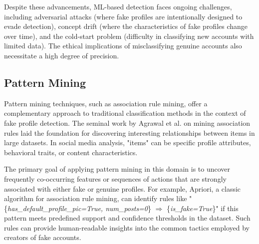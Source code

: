 \documentclass[conference]{IEEEtran}
\begin{document}
Despite these advancements, ML-based detection faces ongoing challenges, including adversarial attacks (where fake profiles are intentionally designed to evade detection), concept drift (where the characteristics of fake profiles change over time), and the cold-start problem (difficulty in classifying new accounts with limited data). The ethical implications of misclassifying genuine accounts also necessitate a high degree of precision.

\subsection{Pattern Mining}
Pattern mining techniques, such as association rule mining, offer a complementary approach to traditional classification methods in the context of fake profile detection. The seminal work by Agrawal et al. \cite{b10} on mining association rules laid the foundation for discovering interesting relationships between items in large datasets. In social media analysis, "items" can be specific profile attributes, behavioral traits, or content characteristics.

The primary goal of applying pattern mining in this domain is to uncover frequently co-occurring features or sequences of actions that are strongly associated with either fake or genuine profiles. For example, Apriori, a classic algorithm for association rule mining, can identify rules like "\{\textit{has\_default\_profile\_pic=True, num\_posts=0}\} $\Rightarrow$ \{\textit{is\_fake=True}\}" if this pattern meets predefined support and confidence thresholds in the dataset. Such rules can provide human-readable insights into the common tactics employed by creators of fake accounts.
\end{document}

